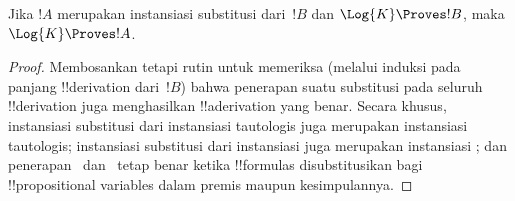 \documentclass[../../../include/open-logic-section]{subfiles}
\begin{document}
\begin{prop}
  Jika $!A$ merupakan instansiasi substitusi dari~$!B$ dan
  $\Log{K}\Proves !B$, maka $\Log{K}\Proves !A$.
\end{prop}

\begin{proof}
  Membosankan tetapi rutin untuk memeriksa (melalui induksi pada panjang
  !!{derivation} dari~$!B$) bahwa penerapan suatu substitusi pada seluruh
  !!{derivation} juga menghasilkan !!a{derivation} yang benar. Secara khusus,
  instansiasi substitusi dari instansiasi tautologis juga merupakan instansiasi
  tautologis; instansiasi substitusi dari instansiasi
   juga merupakan instansiasi
  ; dan penerapan~\MP{} dan~\Nec{}
  tetap benar ketika !!{formula}s disubstitusikan bagi
  !!{propositional variable}s dalam premis maupun kesimpulannya.
\end{proof}
\end{document}
